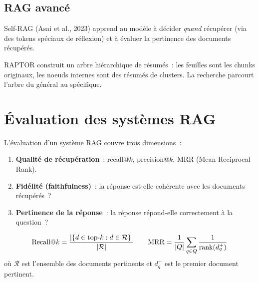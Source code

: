 \subsection{RAG avanc\'e}

\begin{definition}
Self-RAG (Asai et al., 2023) apprend au mod\`ele \`a d\'ecider
\emph{quand} r\'ecup\'erer (via des tokens sp\'eciaux de r\'eflexion)
et \`a \'evaluer la pertinence des documents r\'ecup\'er\'es.
\end{definition}

\begin{definition}[RAPTOR]
RAPTOR construit un arbre hi\'erarchique de r\'esum\'es~: les feuilles
sont les chunks originaux, les noeuds internes sont des r\'esum\'es de
clusters. La recherche parcourt l'arbre du g\'en\'eral au sp\'ecifique.
\end{definition}

\section{\'Evaluation des syst\`emes RAG}
\label{sec:rag:eval}

\begin{definition}
L'\'evaluation d'un syst\`eme RAG couvre trois dimensions~:
\begin{enumerate}
    \item \textbf{Qualit\'e de r\'ecup\'eration}~: recall@$k$,
    precision@$k$, MRR (Mean Reciprocal Rank).
    \item \textbf{Fid\'elit\'e (faithfulness)}~: la r\'eponse est-elle
    coh\'erente avec les documents r\'ecup\'er\'es~?
    \item \textbf{Pertinence de la r\'eponse}~: la r\'eponse
    r\'epond-elle correctement \`a la question~?
\end{enumerate}
\end{definition}

\begin{formules}[title=\textbf{Recall@$k$ et MRR}]
\[
    \text{Recall@}k = \frac{\left| \{d \in \text{top-}k : d \in \mathcal{R}\} \right|}{\left| \mathcal{R} \right|}
    \qquad
    \text{MRR} = \frac{1}{\left| Q \right|} \sum_{q \in Q} \frac{1}{\text{rank}(d_q^+)}
\]
o\`u $\mathcal{R}$ est l'ensemble des documents pertinents et $d_q^+$
est le premier document pertinent.
\end{formules}

